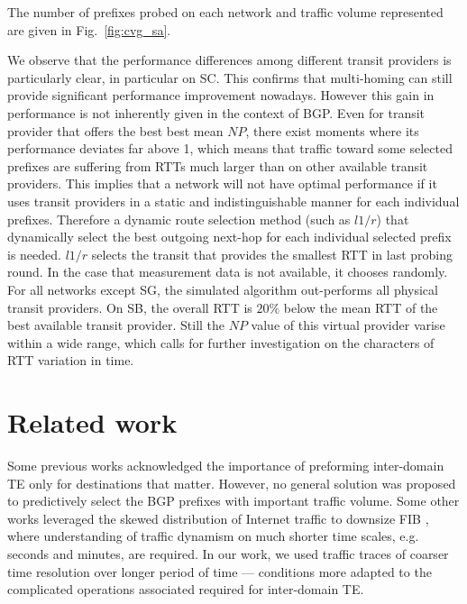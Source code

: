 \documentclass[10pt, conference,letterpaper]{IEEEtran}
\begin{document}
The number of prefixes probed on each network and traffic volume represented are given in Fig.~\ref{fig:cvg_sa}. 


We observe that the performance differences among different transit providers is particularly clear, in particular on SC.
This confirms that multi-homing can still provide significant performance improvement nowadays. 
However this gain in performance is not inherently given in the context of BGP.
Even for transit provider that offers the best best mean $NP$, there exist moments where its performance deviates far above 1, which means that traffic toward some selected prefixes are suffering from RTTs much larger than on other available transit providers.
This implies that a network will not have optimal  performance if it uses transit providers in a static and indistinguishable manner for each individual prefixes.
Therefore a dynamic route selection  method (such as $l1/r$) that dynamically select the best outgoing next-hop for each individual selected prefix is needed. 
$l1/r$ selects the transit that provides the smallest RTT in last probing round. 
In the case that measurement data is not available, it chooses randomly. 
For all networks except SG, the simulated algorithm out-performs all physical transit providers.
On SB, the overall RTT is $20\%$ below the mean RTT of the best available transit provider.
Still the $NP$ value of this virtual provider varise within a wide range, which calls for further investigation on the characters of RTT variation in time.




\section{Related work}
\label{sec:bg}
Some previous works \cite{Feamster2003, Akella2008, Goldenberg2004} acknowledged the importance of preforming inter-domain TE only for destinations that matter.
However, no general solution was proposed to predictively select the BGP prefixes with important traffic volume.
Some other works leveraged the skewed distribution of Internet traffic to downsize FIB \cite{Iannone2007, Ballani2009, Kim2009, Zhang2012, Sarrar2012, Liu2015}, where understanding of traffic dynamism on much shorter time scales, e.g. seconds and minutes, are required. 
In our work, we used traffic traces of coarser time resolution over longer period of time --- conditions more adapted to the complicated operations associated required for inter-domain TE.
\end{document}

